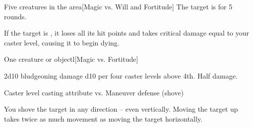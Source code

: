 \begin{spellheader}
\end{spellheader}
\begin{spelleffects}
    \begin{spelltarget}{Five creatures in the area}[Magic vs. Will and Fortitude]
        \spellsuccess[Will] The target is \shaken for 5 rounds.

         If the target is \bloodied, it loses all its hit points and takes critical damage equal to your caster level, causing it to begin dying.
    \end{spelltarget}
\end{spelleffects}

\begin{spellheader}
    \spellrng{\rngmed}
\end{spellheader}
\begin{spelleffects}
    \begin{spelltarget}{One creature or object}l[Magic vs. Fortitude]
        \begin{spellmargin}
            \spellsuccess 2d10 bludgeoning damage \add d10 per four caster levels above 4th.
            \spellfailure Half damage.
        \end{spellmargin}
        \spellatk Caster level \add casting attribute vs. Maneuver defense (shove)
        \begin{spellmargin}
            \spellsuccess You shove the target in any direction -- even vertically. Moving the target up takes twice as much movement as moving the target horizontally.
        \end{spellmargin}
    \end{spelltarget}
\end{spelleffects}

